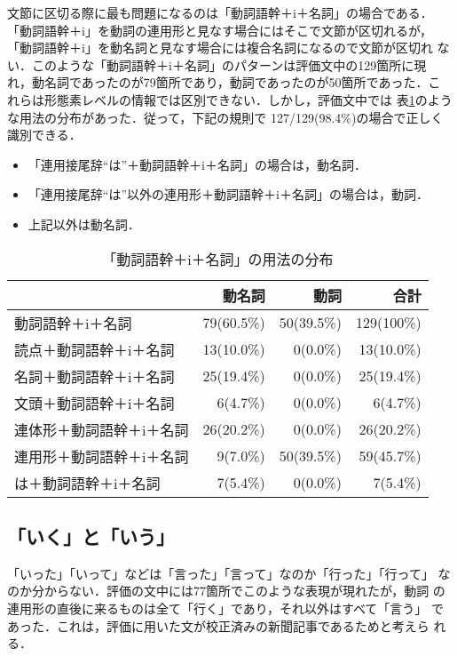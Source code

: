 文節に区切る際に最も問題になるのは「動詞語幹＋i＋名詞」の場合である．
「動詞語幹＋i」を動詞の連用形と見なす場合にはそこで文節が区切れるが，
「動詞語幹＋i」を動名詞と見なす場合には複合名詞になるので文節が区切れ
ない．このような「動詞語幹＋i＋名詞」のパターンは評価文中の129箇所に現
れ，動名詞であったのが79箇所であり，動詞であったのが50箇所であった．こ
れらは形態素レベルの情報では区別できない．しかし，評価文中では
表\ref{doumeisi}のような用法の分布があった．従って，下記の規則で
127/129(98.4\%)の場合で正しく識別できる．
\begin{itemize}
\item 「連用接尾辞``は''＋動詞語幹＋i＋名詞」の場合は，動名詞．
\item 「連用接尾辞``は''以外の連用形＋動詞語幹＋i＋名詞」の場合は，動詞．
\item 上記以外は動名詞．
\end{itemize}

\begin{table}
\begin{center}
\begin{tabular}{|l|r|r|r|} \hline
                          & 動名詞     & 動詞       & 合計 \\ \hline
動詞語幹＋i＋名詞         & 79(60.5\%) & 50(39.5\%) & 129(100\%) \\
読点＋動詞語幹＋i＋名詞   & 13(10.0\%) &  0(0.0\%)  & 13(10.0\%) \\
名詞＋動詞語幹＋i＋名詞   & 25(19.4\%) &  0(0.0\%)  & 25(19.4\%) \\
文頭＋動詞語幹＋i＋名詞   &  6(4.7\%)  &  0(0.0\%)  &  6(4.7\%)  \\
連体形＋動詞語幹＋i＋名詞 & 26(20.2\%) &  0(0.0\%)  & 26(20.2\%) \\
連用形＋動詞語幹＋i＋名詞 &  9(7.0\%)  & 50(39.5\%) & 59(45.7\%) \\
は＋動詞語幹＋i＋名詞     &  7(5.4\%)  &  0(0.0\%)  &  7(5.4\%)  \\
\hline
\end{tabular}
\end{center}
\caption{「動詞語幹＋i＋名詞」の用法の分布}
\label{doumeisi}
\end{table}


\subsection{「いく」と「いう」}
「いった」「いって」などは「言った」「言って」なのか「行った」「行って」
なのか分からない．評価の文中には77箇所でこのような表現が現れたが，動詞
の連用形の直後に来るものは全て「行く」であり，それ以外はすべて「言う」
であった．これは，評価に用いた文が校正済みの新聞記事であるためと考えら
れる．

